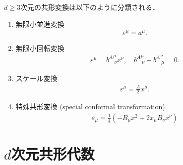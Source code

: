 \(d\geq{}3\)次元の共形変換は以下のように分類される．
\begin{enumerate}
	\item 無限小並進変換
	      \begin{align}
		      \varepsilon^{\mu}=a^{\mu}.
	      \end{align}
	\item 無限小回転変換
	      \begin{align}
		      \varepsilon^{\mu}={b^{A}}^{\mu}_{\ \nu}x^{\nu},\quad{}{b^{A}}^{\mu}_{\ \nu}+{b^{A}}^{\nu}_{\ \mu}=0.
	      \end{align}
	\item スケール変換
	      \begin{align}
		      \varepsilon^{\mu}=\frac{A}{2}x^{\mu}.
	      \end{align}
	\item 特殊共形変換 (special conformal transformation)
	      \begin{align}
		      \varepsilon_{\mu}=\frac{1}{4}\left(-B_{\mu}x^{2}+2x_{\mu}B_{\nu}x^{\nu}\right)
	      \end{align}
\end{enumerate}
\chapter{\(d\)次元共形代数}

